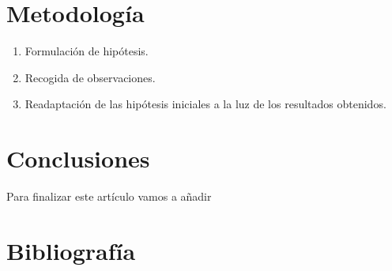 \documentclass{article}
\begin{document}
\section{Metodología}
\begin{enumerate}
    \item Formulación de hipótesis.
    \item Recogida de observaciones.
    \item Readaptación de las hipótesis iniciales a la luz de los resultados obtenidos.
\end{enumerate}

\section{Conclusiones}
Para finalizar este artículo vamos a añadir 


\section{Bibliografía}
\end{document}
